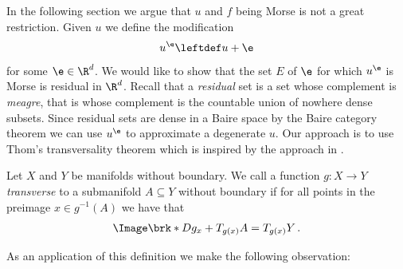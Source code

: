 In the following section we argue that 
$u$ and $f$ being Morse is not a great restriction.
Given $u$ we define the modification
\begin{align}
  u^\e\leftdef u+\e\label{eq:nonDegeneracy:definitionUEps}
\end{align}
for some $\e\in\R^d$. We would like to show that the set $E$ of $\e$ for which $u^\e$ is Morse
is residual in $\R^d$.
Recall that a \emph{residual} set is a set whose complement is \emph{meagre}, that is whose complement
is the countable union of nowhere dense subsets.
Since residual sets are dense in a Baire space by the Baire category theorem we can 
use $u^\e$ to approximate a degenerate $u$.
Our approach is to use Thom's transversality theorem which is inspired by the approach in \cite[Chapter 6]{Hirsch1994}.
\begin{definition}
  Let $X$ and $Y$ be manifolds without boundary.
  We call a function $g\colon X\to Y$
  \emph{transverse} to a submanifold $A\subseteq Y$ without boundary if for all points in the 
  preimage $x\in g^{-1}(A)$ we have that
  \begin{align}
    \Image\brk*{Dg_x}+T_{g(x)}A = T_{g(x)}Y\,.\label{eq:nonDegeneracy_defTransversality}
  \end{align}
\end{definition}
As an application of this definition we make the following observation:
